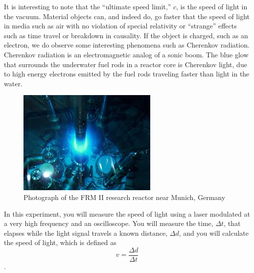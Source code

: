\documentclass{tufte-handout}
\begin{document}
It is interesting to note that the ``ultimate speed limit,'' $c$, is the speed of light in the vacuum.  Material objects can, and indeed do, go faster that the speed of light in media such as air with no violation of special relativity or ``strange'' effects such as time travel or breakdown in causality.  If the object is charged, such as an electron, we do observe some interesting phenomena such as Cherenkov radiation.
 Cherenkov radiation is an electromagnetic analog of a sonic boom.  The blue glow that surrounds the underwater fuel rods in a reactor core is Cherenkov light, due to high energy electrons emitted by the fuel rods traveling faster than light in the water.

\begin{figure}
\centering
\includegraphics{../images/cherenkov.jpg}
\caption{Photograph of the FRM II research reactor near Munich, Germany}
\end{figure}


In this experiment, you will measure the speed of light using a laser 
modulated at a very high frequency and an oscilloscope. You will 
measure the time, $\Delta t$, that elapses while the light signal travels a 
known distance, $\Delta d$, and you will calculate the speed of light, which is 
defined as 
\[
v = \frac{\Delta d}{\Delta t}
\]. 
\end{document}
